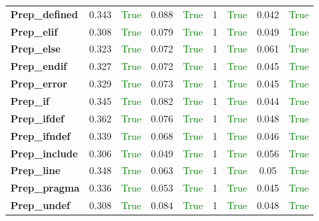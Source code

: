 \documentclass{article}
\begin{document}
\begin{xltabular}{\textwidth}{lcccccccc}
\textbf{{\fontsize{10}{12}\selectfont Prep\_defined}}& 0.343&\textcolor{green}{True}& 0.088&\textcolor{green}{True}& 1&\textcolor{green}{True}& 0.042&\textcolor{green}{True} \\[0.5ex]
\textbf{{\fontsize{10}{12}\selectfont Prep\_elif}}& 0.308&\textcolor{green}{True}& 0.079&\textcolor{green}{True}& 1&\textcolor{green}{True}& 0.049&\textcolor{green}{True} \\[0.5ex]
\textbf{{\fontsize{10}{12}\selectfont Prep\_else}}& 0.323&\textcolor{green}{True}& 0.072&\textcolor{green}{True}& 1&\textcolor{green}{True}& 0.061&\textcolor{green}{True} \\[0.5ex]
\textbf{{\fontsize{10}{12}\selectfont Prep\_endif}}& 0.327&\textcolor{green}{True}& 0.072&\textcolor{green}{True}& 1&\textcolor{green}{True}& 0.045&\textcolor{green}{True} \\[0.5ex]
\textbf{{\fontsize{10}{12}\selectfont Prep\_error}}& 0.329&\textcolor{green}{True}& 0.073&\textcolor{green}{True}& 1&\textcolor{green}{True}& 0.045&\textcolor{green}{True} \\[0.5ex]
\textbf{{\fontsize{10}{12}\selectfont Prep\_if}}& 0.345&\textcolor{green}{True}& 0.082&\textcolor{green}{True}& 1&\textcolor{green}{True}& 0.044&\textcolor{green}{True} \\[0.5ex]
\textbf{{\fontsize{10}{12}\selectfont Prep\_ifdef}}& 0.362&\textcolor{green}{True}& 0.076&\textcolor{green}{True}& 1&\textcolor{green}{True}& 0.048&\textcolor{green}{True} \\[0.5ex]
\textbf{{\fontsize{10}{12}\selectfont Prep\_ifndef}}& 0.339&\textcolor{green}{True}& 0.068&\textcolor{green}{True}& 1&\textcolor{green}{True}& 0.046&\textcolor{green}{True} \\[0.5ex]
\textbf{{\fontsize{10}{12}\selectfont Prep\_include}}& 0.306&\textcolor{green}{True}& 0.049&\textcolor{green}{True}& 1&\textcolor{green}{True}& 0.056&\textcolor{green}{True} \\[0.5ex]
\textbf{{\fontsize{10}{12}\selectfont Prep\_line}}& 0.348&\textcolor{green}{True}& 0.063&\textcolor{green}{True}& 1&\textcolor{green}{True}& 0.05&\textcolor{green}{True} \\[0.5ex]
\textbf{{\fontsize{10}{12}\selectfont Prep\_pragma}}& 0.336&\textcolor{green}{True}& 0.053&\textcolor{green}{True}& 1&\textcolor{green}{True}& 0.045&\textcolor{green}{True} \\[0.5ex]
\textbf{{\fontsize{10}{12}\selectfont Prep\_undef}}& 0.308&\textcolor{green}{True}& 0.084&\textcolor{green}{True}& 1&\textcolor{green}{True}& 0.048&\textcolor{green}{True} \\[0.5ex]

\end{xltabular}
\end{document}
